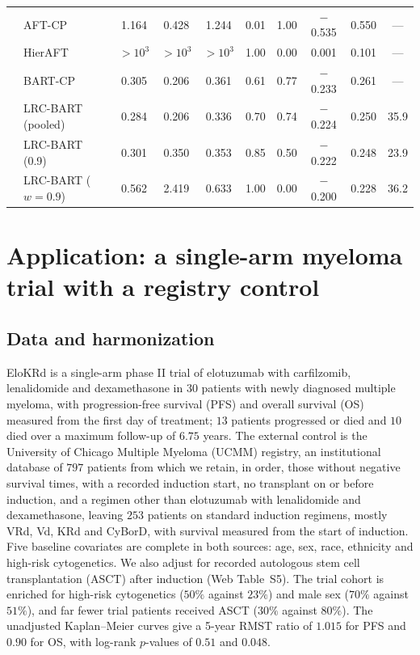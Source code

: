 \documentclass[11pt]{article}
\theoremstyle{definition}
\theoremstyle{plain}
\begin{document}
\begin{longtable}{llcccccccc}
\midrule
{} & AFT-CP & 1.164 & 0.428 & 1.244 & 0.01 & 1.00 & $-$0.535 & 0.550 & --- \\*
& HierAFT & $>\!10^{3}$ & $>\!10^{3}$ & $>\!10^{3}$ & 1.00 & 0.00 & 0.001 & 0.101 & --- \\*
& BART-CP & 0.305 & 0.206 & 0.361 & 0.61 & 0.77 & $-$0.233 & 0.261 & --- \\*
& LRC-BART (pooled) & 0.284 & 0.206 & 0.336 & 0.70 & 0.74 & $-$0.224 & 0.250 & 35.9 \\*
& LRC-BART (0.9) & 0.301 & 0.350 & 0.353 & 0.85 & 0.50 & $-$0.222 & 0.248 & 23.9 \\*
& LRC-BART ($w=0.9$) & 0.562 & 2.419 & 0.633 & 1.00 & 0.00 & $-$0.200 & 0.228 & 36.2 \\
\end{longtable}
\endgroup


\section{Application: a single-arm myeloma trial with a registry control}
\label{sec:application}

\subsection{Data and harmonization}
\label{sec:app_data}

EloKRd is a single-arm phase II trial of elotuzumab with carfilzomib, lenalidomide and dexamethasone in $30$ patients with newly diagnosed multiple myeloma, with progression-free survival (PFS) and overall survival (OS) measured from the first day of treatment; $13$ patients progressed or died and $10$ died over a maximum follow-up of $6.75$ years. The external control is the University of Chicago Multiple Myeloma (UCMM) registry, an institutional database of $797$ patients from which we retain, in order, those without negative survival times, with a recorded induction start, no transplant on or before induction, and a regimen other than elotuzumab with lenalidomide and dexamethasone, leaving $253$ patients on standard induction regimens, mostly VRd, Vd, KRd and CyBorD, with survival measured from the start of induction. Five baseline covariates are complete in both sources: age, sex, race, ethnicity and high-risk cytogenetics. We also adjust for recorded autologous stem cell transplantation (ASCT) after induction (Web Table~S5). The trial cohort is enriched for high-risk cytogenetics ($50\%$ against $23\%$) and male sex ($70\%$ against $51\%$), and far fewer trial patients received ASCT ($30\%$ against $80\%$). The unadjusted Kaplan--Meier curves give a 5-year RMST ratio of $1.015$ for PFS and $0.90$ for OS, with log-rank $p$-values of $0.51$ and $0.048$.
\end{document}
